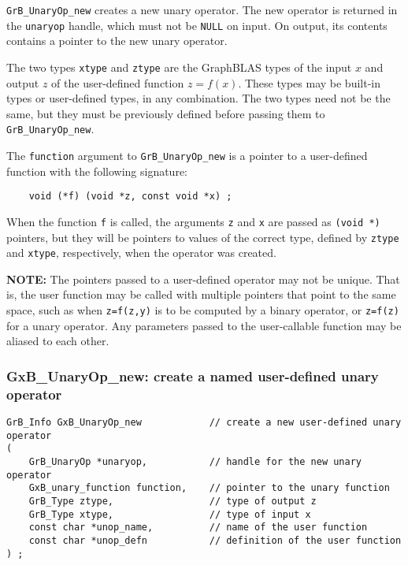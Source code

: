 \documentclass[12pt]{article}
\begin{document}
{\verb'GrB_UnaryOp_new' creates a new unary operator.  The new operator is
returned in the \verb'unaryop' handle, which must not be \verb'NULL' on input.
On output, its contents contains a pointer to the new unary operator.

The two types \verb'xtype' and \verb'ztype' are the GraphBLAS types of the
input $x$ and output $z$ of the user-defined function $z=f(x)$.  These types
may be built-in types or user-defined types, in any combination.  The two types
need not be the same, but they must be previously defined before passing them
to \verb'GrB_UnaryOp_new'.

The \verb'function' argument to \verb'GrB_UnaryOp_new' is a pointer to a
user-defined function with the following signature:

    {\footnotesize
    \begin{verbatim}
    void (*f) (void *z, const void *x) ; \end{verbatim} }

When the function \verb'f' is called, the arguments \verb'z' and \verb'x' are
passed as \verb'(void *)' pointers, but they will be pointers to values of the
correct type, defined by \verb'ztype' and \verb'xtype', respectively, when the
operator was created.

{\bf NOTE:}
The pointers passed to a user-defined operator may not be unique.  That is, the
user function may be called with multiple pointers that point to the same
space, such as when \verb'z=f(z,y)' is to be computed by a binary operator, or
\verb'z=f(z)' for a unary operator.  Any parameters passed to the user-callable
function may be aliased to each other.

\newpage
\subsubsection{{\sf GxB\_UnaryOp\_new:} create a named user-defined unary operator}
\label{unaryop_new_named}

\begin{mdframed}[userdefinedwidth=6in]
{\footnotesize
\begin{verbatim}
GrB_Info GxB_UnaryOp_new            // create a new user-defined unary operator
(
    GrB_UnaryOp *unaryop,           // handle for the new unary operator
    GxB_unary_function function,    // pointer to the unary function
    GrB_Type ztype,                 // type of output z
    GrB_Type xtype,                 // type of input x
    const char *unop_name,          // name of the user function
    const char *unop_defn           // definition of the user function
) ;
\end{verbatim} }\end{mdframed}

}
\end{document}
